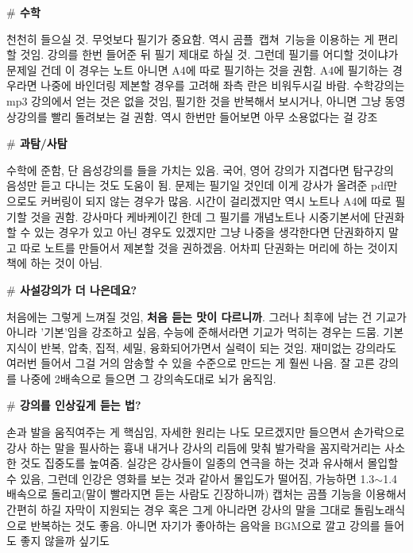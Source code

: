 \textbf{$\#$ 수학}
\vspace{5mm}

천천히 들으실 것. 무엇보다 필기가 중요함.
역시 곰플 캡쳐 기능을 이용하는 게 편리할 것임. 강의를 한번 들어준 뒤 필기 제대로 하실 것.
그런데 필기를 어디할 것이냐가 문제일 건데 이 경우는 노트 아니면 A4에 따로 필기하는 것을 권함.
A4에 필기하는 경우라면 나중에 바인더링 제본할 경우를 고려해 좌측 란은 비워두시길 바람.
수학강의는 mp3 강의에서 얻는 것은 없을 것임, 필기한 것을 반복해서 보시거나, 아니면 그냥 동영상강의를 빨리 돌려보는 걸 권함.
역시 한번만 들어보면 아무 소용없다는 걸 강조
\vspace{5mm}

\textbf{$\#$ 과탐/사탐}
\vspace{5mm}

수학에 준함, 단 음성강의를 들을 가치는 있음. 국어, 영어 강의가 지겹다면 탐구강의 음성만 듣고 다니는 것도 도움이 됨.
문제는 필기일 것인데 이게 강사가 올려준 pdf만으로도 커버링이 되지 않는 경우가 많음.
시간이 걸리겠지만 역시 노트나 A4에 따로 필기할 것을 권함.
강사마다 케바케이긴 한데 그 필기를 개념노트나 시중기본서에 단권화할 수 있는 경우가 있고 아닌 경우도 있겠지만
그냥 나중을 생각한다면 단권화하지 말고 따로 노트를 만들어서 제본할 것을 권하겠음.
어차피 단권화는 머리에 하는 것이지 책에 하는 것이 아님.
\vspace{5mm}

\textbf{$\#$ 사설강의가 더 나은데요?}
\vspace{5mm}

처음에는 그렇게 느껴질 것임, \textbf{처음 듣는 맛이 다르니까}.
그러나 최후에 남는 건 기교가 아니라 '기본'임을 강조하고 싶음, 수능에 준해서라면 기교가 먹히는 경우는 드뭄.
기본 지식이 반복, 압축, 집적, 세밀, 융화되어가면서 실력이 되는 것임.
재미없는 강의라도 여러번 들어서 그걸 거의 암송할 수 있을 수준으로 만드는 게 훨씬 나음.
잘 고른 강의를 나중에 2배속으로 들으면 그 강의속도대로 뇌가 움직임.
\vspace{5mm}

\textbf{$\#$ 강의를 인상깊게 듣는 법?}
\vspace{5mm}

손과 발을 움직여주는 게 핵심임, 자세한 원리는 나도 모르겠지만 들으면서 손가락으로 강사 하는 말을 필사하는 흉내 내거나
강사의 리듬에 맞춰 발가락을 꼼지락거리는 사소한 것도 집중도를 높여줌.
실강은 강사들이 일종의 연극을 하는 것과 유사해서 몰입할 수 있음, 그런데 인강은 영화를 보는 것과 같아서 몰입도가 떨어짐,
가능하면 1.3$\sim$1.4 배속으로 돌리고(말이 빨라지면 듣는 사람도 긴장하니까) 캡처는 곰플 기능을 이용해서 간편히 하길
자막이 지원되는 경우 혹은 그게 아니라면 강사의 말을 그대로 돌림노래식으로 반복하는 것도 좋음.
아니면 자기가 좋아하는 음악을 BGM으로 깔고 강의를 들어도 좋지 않을까 싶기도
\vspace{5mm}


